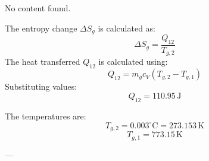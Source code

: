 No content found.

The entropy change \( \Delta S_g \) is calculated as:  
\[
\Delta S_g = \frac{Q_{12}}{T_{g,2}}
\]  
The heat transferred \( Q_{12} \) is calculated using:  
\[
Q_{12} = m_g c_V (T_{g,2} - T_{g,1})
\]  
Substituting values:  
\[
Q_{12} = 110.95 \, \text{J}
\]  

The temperatures are:  
\[
T_{g,2} = 0.003^\circ \text{C} = 273.153 \, \text{K}
\]  
\[
T_{g,1} = 773.15 \, \text{K}
\]  

---